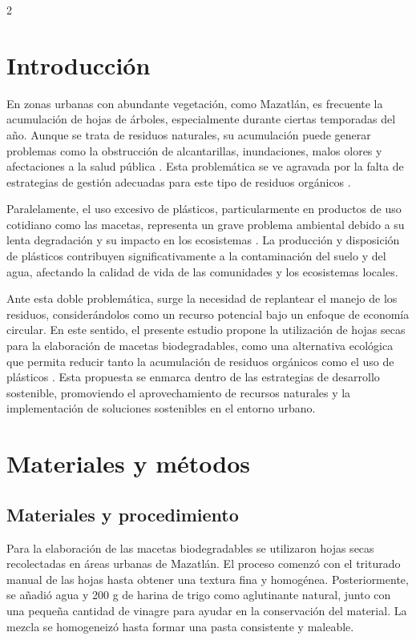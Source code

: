 \begin{multicols}{2}

\section{Introducción}

En zonas urbanas con abundante vegetación, como Mazatlán, es frecuente la acumulación de hojas de árboles, especialmente durante ciertas temporadas del año. Aunque se trata de residuos naturales, su acumulación puede generar problemas como la obstrucción de alcantarillas, inundaciones, malos olores y afectaciones a la salud pública \citep{crowther2015mapping}. Esta problemática se ve agravada por la falta de estrategias de gestión adecuadas para este tipo de residuos orgánicos \citep{fao2019food}.

Paralelamente, el uso excesivo de plásticos, particularmente en productos de uso cotidiano como las macetas, representa un grave problema ambiental debido a su lenta degradación y su impacto en los ecosistemas \citep{unep2018singleuse}. La producción y disposición de plásticos contribuyen significativamente a la contaminación del suelo y del agua, afectando la calidad de vida de las comunidades y los ecosistemas locales.

Ante esta doble problemática, surge la necesidad de replantear el manejo de los residuos, considerándolos como un recurso potencial bajo un enfoque de economía circular. En este sentido, el presente estudio propone la utilización de hojas secas para la elaboración de macetas biodegradables, como una alternativa ecológica que permita reducir tanto la acumulación de residuos orgánicos como el uso de plásticos \citep{fuentes2021development}. Esta propuesta se enmarca dentro de las estrategias de desarrollo sostenible, promoviendo el aprovechamiento de recursos naturales y la implementación de soluciones sostenibles en el entorno urbano.

\section{Materiales y métodos}

\subsection{Materiales y procedimiento}

Para la elaboración de las macetas biodegradables se utilizaron hojas secas recolectadas en áreas urbanas de Mazatlán. El proceso comenzó con el triturado manual de las hojas hasta obtener una textura fina y homogénea. Posteriormente, se añadió agua y 200 g de harina de trigo como aglutinante natural, junto con una pequeña cantidad de vinagre para ayudar en la conservación del material. La mezcla se homogeneizó hasta formar una pasta consistente y maleable.


\end{multicols}
